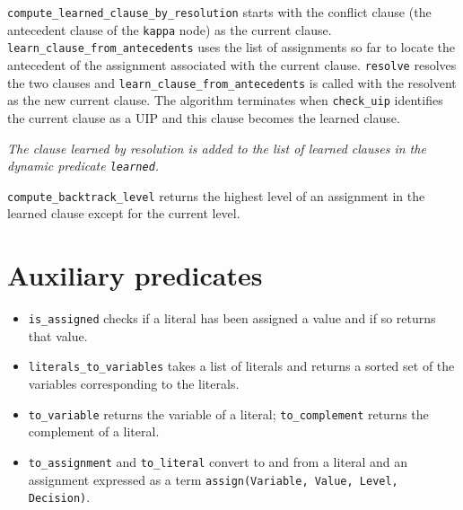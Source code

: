 \documentclass[11pt]{article}
\newcommand*{\p}[1]{\textup{\texttt{#1}}}
\begin{document}
\p{compute\_learned\_clause\_by\_resolution} starts with the conflict
clause (the antecedent clause of the \p{kappa} node) as the current
clause. \p{learn\_clause\_from\_antecedents} uses the list of
assignments so far to locate the antecedent of the assignment associated
with the current clause. \p{resolve} resolves the two clauses and
\p{learn\_clause\_from\_antecedents} is called with the resolvent as the
new current clause. The algorithm terminates when \p{check\_uip}
identifies the current clause as a UIP and this clause becomes the
learned clause.

\emph{The clause learned by resolution is added to the list of learned
clauses in the dynamic predicate \p{learned}.}

\p{compute\_backtrack\_level} returns the highest level of an assignment
in the learned clause except for the current level.


\section{Auxiliary predicates}\label{s.aux}

\begin{itemize}

\item \p{is\_assigned} checks if a literal has been assigned a value
and if so returns that value.

\item \p{literals\_to\_variables} takes a list of literals and returns a
sorted set of the variables corresponding to the literals.

\item \p{to\_variable} returns the variable of a literal;
\p{to\_complement} returns the complement of a literal.

\item \p{to\_assignment} and \p{to\_literal} convert to and from a
literal and an assignment expressed as a term \p{assign(Variable, Value,
Level, Decision)}.

\end{itemize}




\end{document}
